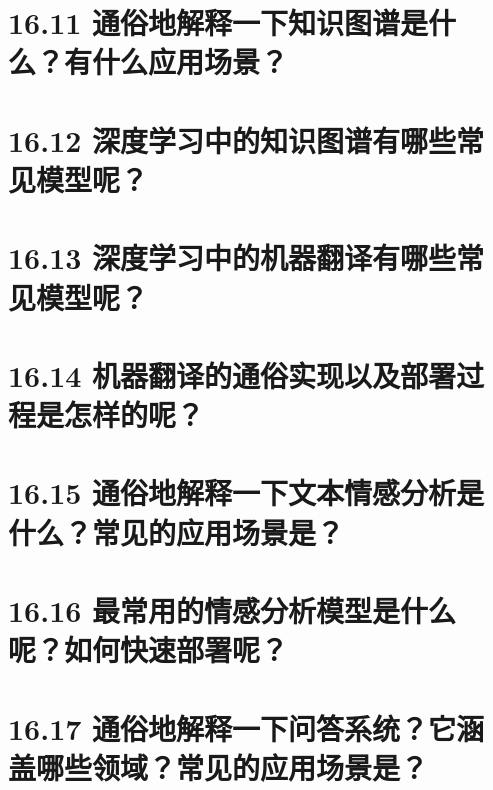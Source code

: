 \section{16.11
通俗地解释一下知识图谱是什么？有什么应用场景？}\label{ux901aux4fd7ux5730ux89e3ux91caux4e00ux4e0bux77e5ux8bc6ux56feux8c31ux662fux4ec0ux4e48ux6709ux4ec0ux4e48ux5e94ux7528ux573aux666f}

\section{16.12
深度学习中的知识图谱有哪些常见模型呢？}\label{ux6df1ux5ea6ux5b66ux4e60ux4e2dux7684ux77e5ux8bc6ux56feux8c31ux6709ux54eaux4e9bux5e38ux89c1ux6a21ux578bux5462}

\section{16.13
深度学习中的机器翻译有哪些常见模型呢？}\label{ux6df1ux5ea6ux5b66ux4e60ux4e2dux7684ux673aux5668ux7ffbux8bd1ux6709ux54eaux4e9bux5e38ux89c1ux6a21ux578bux5462}

\section{16.14
机器翻译的通俗实现以及部署过程是怎样的呢？}\label{ux673aux5668ux7ffbux8bd1ux7684ux901aux4fd7ux5b9eux73b0ux4ee5ux53caux90e8ux7f72ux8fc7ux7a0bux662fux600eux6837ux7684ux5462}

\section{16.15
通俗地解释一下文本情感分析是什么？常见的应用场景是？}\label{ux901aux4fd7ux5730ux89e3ux91caux4e00ux4e0bux6587ux672cux60c5ux611fux5206ux6790ux662fux4ec0ux4e48ux5e38ux89c1ux7684ux5e94ux7528ux573aux666fux662f}

\section{16.16
最常用的情感分析模型是什么呢？如何快速部署呢？}\label{ux6700ux5e38ux7528ux7684ux60c5ux611fux5206ux6790ux6a21ux578bux662fux4ec0ux4e48ux5462ux5982ux4f55ux5febux901fux90e8ux7f72ux5462}

\section{16.17
通俗地解释一下问答系统？它涵盖哪些领域？常见的应用场景是？}\label{ux901aux4fd7ux5730ux89e3ux91caux4e00ux4e0bux95eeux7b54ux7cfbux7edfux5b83ux6db5ux76d6ux54eaux4e9bux9886ux57dfux5e38ux89c1ux7684ux5e94ux7528ux573aux666fux662f}

